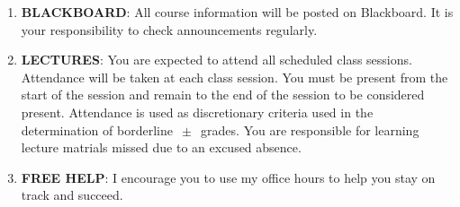 \documentclass[12pt]{amsart}
\begin{document}
\begin {enumerate}
\begin {enumerate}
To enroll, you will need the {\bf Course ID} for this class, which is {\bf kim76514}. Please see the last page of the syllabus for the Student Registration Instructions.  \\
\item {\bf  BLACKBOARD}: All course information will be posted on Blackboard. It is your responsibility to check announcements regularly.\\ 
\item {\bf LECTURES}: You are expected to attend all scheduled class sessions. Attendance will be taken at each class session. You must be present from the start of the session and remain to the end of the session to be considered present. Attendance is used as discretionary criteria used in the determination of borderline $\,\pm\,$ grades. You are responsible for learning lecture matrials missed due to an excused absence. \\

\item {\bf FREE HELP}: I encourage you to use my office hours to help you stay on track and succeed.  \\


\end{enumerate}
\end{enumerate}
\end{document}

